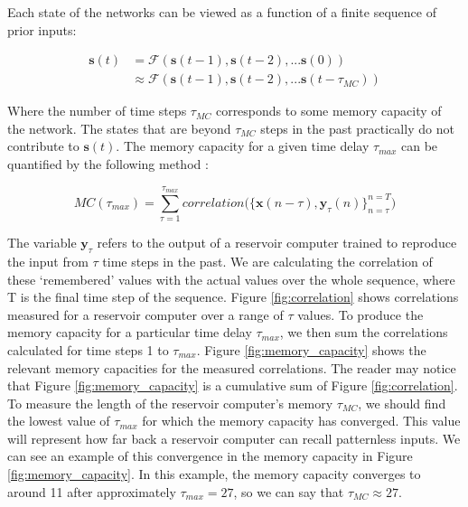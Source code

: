 \documentclass[a4paper,12pt]{article}
\begin{document}
Each state of the networks can be viewed as a function of a finite sequence of prior inputs:

\begin{align}
\mathbf{s}(t) &= \mathcal{F}(\mathbf{s}(t-1), \mathbf{s}(t-2), ... \mathbf{s}(0)) \\
&\approx \mathcal{F}(\mathbf{s}(t-1), \mathbf{s}(t-2), ... \mathbf{s}(t-\tau_{MC}))
\end{align}

Where the number of time steps $\tau_{MC}$ corresponds to some memory capacity of the network. The states that are beyond $\tau_{MC}$ steps in the past practically do not contribute to $\mathbf{s}(t)$. The memory capacity for a given time delay $\tau_{max}$ can be quantified by the following method :

\begin{equation*}
MC(\tau_{max}) = \sum^{\tau_{max}}_{\tau=1} correlation\bigg(\{\mathbf{x}(n-\tau), \mathbf{y}_\tau(n)\}_{n=\tau}^{n=T}\bigg)
\end{equation*}

The variable $\mathbf{y}_\tau$ refers to the output of a reservoir computer trained to reproduce the input from $\tau$ time steps in the past. We are calculating the correlation of these `remembered' values with the actual values over the whole sequence, where T is the final time step of the sequence. Figure \ref{fig:correlation} shows correlations measured for a reservoir computer over a range of $\tau$ values. To produce the memory capacity for a particular time delay $\tau_{max}$, we then sum the correlations calculated for time steps 1 to $\tau_{max}$. Figure \ref{fig:memory_capacity} shows the relevant memory capacities for the measured correlations. The reader may notice that Figure \ref{fig:memory_capacity} is a cumulative sum of Figure \ref{fig:correlation}. To measure the length of the reservoir computer's memory $\tau_{MC}$, we should find the lowest value of $\tau_{max}$ for which the memory capacity has converged. This value will represent how far back a reservoir computer can recall patternless inputs. We can see an example of this convergence in the memory capacity in Figure \ref{fig:memory_capacity}. In this example, the memory capacity converges to around 11 after approximately $\tau_{max} = 27$, so we can say that $\tau_{MC} \approx 27$.
\end{document}
